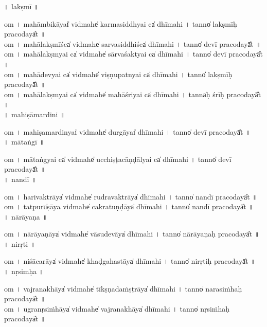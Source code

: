 \documentclass[parskip, DIV=14]{scrartcl}
\begin{document}
\vspace{0.201cm} ॥   lakṣmī  ॥ \par
  om  । ma॒hā॒mbi॒kāyai̍ vi॒dmahe̍ karmasi॒ddhyai ca̍ dhīmahi  ।  tanno̍ lakṣmīḥ praco॒dayā̎t ॥ \\
  om  । ma॒hā॒la॒kṣmīśca̍ vi॒dmahe̍ sarvasi॒ddhiśca̍ dhīmahi  ।  tanno̍ devī praco॒dayā̎t ॥ \\
  om  । ma॒hā॒la॒kṣmyai ca̍ vi॒dmahe̍ sārvaśa॒ktyai ca̍ dhīmahi  ।  tanno̍ devī praco॒dayā̎t ॥ \\
  om  । ma॒hā॒de॒vyai ca̍ vi॒dmahe̍ viṣṇupa॒tnyai ca̍ dhīmahi   ।  tanno̍ lakṣmīḥ praco॒dayā̎t ॥ \\
  om  । ma॒hā॒la॒kṣmyai ca̍ vi॒dmahe̍ mahāśri॒yai ca̍ dhīmahi  ।  tanna̍ḥ śrīḥ praco॒dayā̎t ॥ \\

\vspace{0.201cm} ॥   mahiṣāmardini  ॥ \par
  om  । ma॒hi॒ṣa॒ma॒rdinyai̍ vi॒dmahe̍ du॒rgāyai̍ dhīmahi  ।  tanno̍ devī praco॒dayā̎t ॥ \\

\vspace{0.201cm} ॥   mātaṅgī  ॥ \par
  om  । mā॒ta॒ṅgyai ca̍ vi॒dmahe̍ ucchiṣṭacāṇḍā॒lyai ca̍ dhīmahi  ।  tanno̍ devī praco॒dayā̎t ॥ \\

\vspace{0.201cm} ॥   nandī  ॥ \par
  om  । ha॒ri॒va॒ktrāya̍ vi॒dmahe̍ rudrava॒ktrāya̍ dhīmahi  ।  tanno̍ nandī praco॒dayā̎t ॥ \\
  om  । tatpuru̍ṣāya vi॒dmahe̍ cakratu॒ṇḍāya̍ dhīmahi  ।  tanno̍ nandī praco॒dayā̎t ॥ \\

\vspace{0.201cm} ॥   nārāyaṇa  ॥ \par
  om  । nā॒rā॒ya॒ṇāya̍ vi॒dmahe̍ vāsude॒vāya̍ dhīmahi  ।  tanno̍ nārāyaṇaḥ praco॒dayā̎t ॥ \\

\vspace{0.201cm} ॥   nirṛti  ॥ \par
  om  । ni॒śā॒ca॒rāya̍ vi॒dmahe̍ khaḍgaha॒stāya̍ dhīmahi  ।  tanno̍ nirṛtiḥ praco॒dayā̎t ॥ \\

\vspace{0.201cm} ॥   nṛsimḥa  ॥ \par
  om  । va॒jra॒na॒khāya̍ vi॒dmahe̍ tīkṣṇada॒ṁṣṭrāya̍ dhīmahi  ।  tanno̍ narasiṁhaḥ praco॒dayā̎t ॥ \\
  om  । u॒gra॒nṛ॒si॒ṁhāya̍ vi॒dmahe̍ vajrana॒khāya̍ dhīmahi  ।  tanno̍ nṛsiṁhaḥ praco॒dayā̎t ॥ \\
\end{document}

